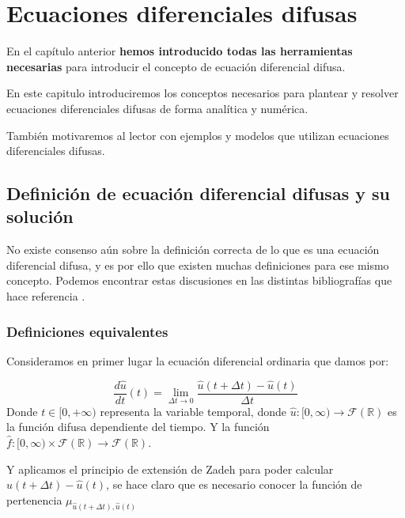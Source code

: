 \chapter{Ecuaciones diferenciales difusas}
En el capítulo anterior \textbf{hemos introducido todas las herramientas necesarias} para introducir el concepto de ecuación diferencial difusa.

En este capitulo introduciremos los conceptos necesarios para plantear y resolver ecuaciones diferenciales difusas de forma analítica y numérica.

También motivaremos al lector con ejemplos y modelos que utilizan ecuaciones diferenciales difusas.

\section{Definición de ecuación diferencial difusas y su solución}
No existe consenso aún sobre la definición correcta de lo que es una ecuación diferencial difusa, y es por ello que existen muchas definiciones para ese mismo concepto. Podemos encontrar estas discusiones en las distintas bibliografías que hace referencia \cite{fuzzyeqn}.

\subsection{Definiciones equivalentes}
Consideramos en primer lugar la ecuación diferencial ordinaria que damos por:

\[
	\frac{d\hat{u}}{dt} (t) = \lim\limits_{\Delta t \rightarrow 0} \frac{\hat{u}(t + \Delta t) - \hat{u}(t)}{\Delta t}
\]
Donde $t \in [0, +\infty)$ representa la variable temporal, donde $\hat{u} : [0, \infty) \longrightarrow \mathcal{F}(\mathbb{R})$ es la función difusa dependiente del tiempo. Y la función $\hat{f} : [0, \infty) \times \mathcal{F}(\mathbb{R}) \rightarrow \mathcal{F}(\mathbb{R})$.

Y aplicamos el principio de extensión de Zadeh para poder calcular $\hat{u}(t + \Delta t) - \hat{u}(t)$, se hace claro que es necesario conocer la función de pertenencia $\mu_{\hat{u}(t+\Delta t), \hat{u}(t)}$